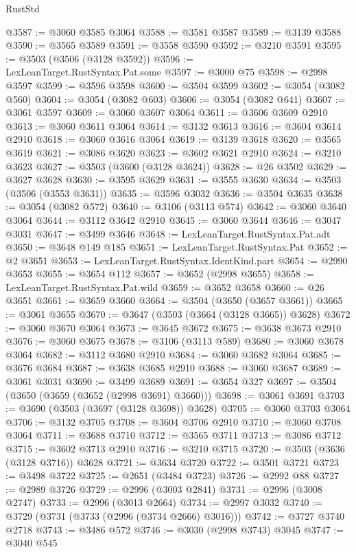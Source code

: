\begin{lexlean}{RustStd}
\begin{coremodule}
@3587 := @3060 @3585 @3064
@3588 := @3581 @3587
@3589 := @3139 @3588
@3590 := @3565 @3589
@3591 := @3558 @3590
@3592 := @3210 @3591
@3595 := @3503 (@3506 (@3128 @3592))
@3596 := LexLeanTarget.RustSyntax.Pat.some
@3597 := @3000 @75
@3598 := @2998 @3597
@3599 := @3596 @3598
@3600 := @3504 @3599
@3602 := @3054 (@3082 @560)
@3604 := @3054 (@3082 @603)
@3606 := @3054 (@3082 @641)
@3607 := @3061 @3597
@3609 := @3060 @3607 @3064
@3611 := @3606 @3609 @2910
@3613 := @3060 @3611 @3064
@3614 := @3132 @3613
@3616 := @3604 @3614 @2910
@3618 := @3060 @3616 @3064
@3619 := @3139 @3618
@3620 := @3565 @3619
@3621 := @3086 @3620
@3623 := @3602 @3621 @2910
@3624 := @3210 @3623
@3627 := @3503 (@3600 (@3128 @3624))
@3628 := @26 @3502
@3629 := @3627 @3628
@3630 := @3595 @3629
@3631 := @3555 @3630
@3634 := @3503 (@3506 (@3553 @3631))
@3635 := @3596 @3032
@3636 := @3504 @3635
@3638 := @3054 (@3082 @572)
@3640 := @3106 (@3113 @574)
@3642 := @3060 @3640 @3064
@3644 := @3112 @3642 @2910
@3645 := @3060 @3644
@3646 := @3047 @3031
@3647 := @3499 @3646
@3648 := LexLeanTarget.RustSyntax.Pat.adt
@3650 := @3648 @149 @185
@3651 := LexLeanTarget.RustSyntax.Pat
@3652 := @2 @3651
@3653 := LexLeanTarget.RustSyntax.IdentKind.part
@3654 := @2990 @3653
@3655 := @3654 @112
@3657 := @3652 (@2998 @3655)
@3658 := LexLeanTarget.RustSyntax.Pat.wild
@3659 := @3652 @3658
@3660 := @26 @3651
@3661 := @3659 @3660
@3664 := @3504 (@3650 (@3657 @3661))
@3665 := @3061 @3655
@3670 := @3647 (@3503 (@3664 (@3128 @3665)) @3628)
@3672 := @3060 @3670 @3064
@3673 := @3645 @3672
@3675 := @3638 @3673 @2910
@3676 := @3060 @3675
@3678 := @3106 (@3113 @589)
@3680 := @3060 @3678 @3064
@3682 := @3112 @3680 @2910
@3684 := @3060 @3682 @3064
@3685 := @3676 @3684
@3687 := @3638 @3685 @2910
@3688 := @3060 @3687
@3689 := @3061 @3031
@3690 := @3499 @3689
@3691 := @3654 @327
@3697 := @3504 (@3650 (@3659 (@3652 (@2998 @3691) @3660)))
@3698 := @3061 @3691
@3703 := @3690 (@3503 (@3697 (@3128 @3698)) @3628)
@3705 := @3060 @3703 @3064
@3706 := @3132 @3705
@3708 := @3604 @3706 @2910
@3710 := @3060 @3708 @3064
@3711 := @3688 @3710
@3712 := @3565 @3711
@3713 := @3086 @3712
@3715 := @3602 @3713 @2910
@3716 := @3210 @3715
@3720 := @3503 (@3636 (@3128 @3716)) @3628
@3721 := @3634 @3720
@3722 := @3501 @3721
@3723 := @3498 @3722
@3725 := @2651 (@3484 @3723)
@3726 := @2992 @88
@3727 := @2989 @3726
@3729 := @2996 (@3003 @2841)
@3731 := @2996 (@3008 @2747)
@3733 := @2996 (@3013 @2664)
@3734 := @2997 @3032
@3740 := @3729 (@3731 (@3733 (@2996 (@3734 @2666) @3016)))
@3742 := @3727 @3740 @2718
@3743 := @3486 @572
@3746 := @3030 (@2998 @3743) @3045
@3747 := @3040 @545

\end{coremodule}
\end{lexlean}

